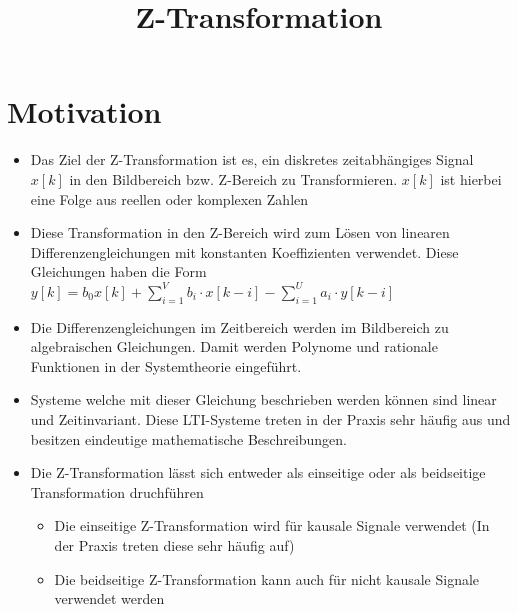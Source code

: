 \documentclass[11pt]{article}
\title{Z-Transformation}
\begin{document}
    
    
    \maketitle
    
    

    
    \section{Motivation}\label{motivation}

\begin{itemize}
\item
  Das Ziel der Z-Transformation ist es, ein diskretes zeitabhängiges
  Signal \(x[k]\) in den Bildbereich bzw. Z-Bereich zu Transformieren.
  \(x[k]\) ist hierbei eine Folge aus reellen oder komplexen Zahlen
\item
  Diese Transformation in den Z-Bereich wird zum Lösen von linearen
  Differenzengleichungen mit konstanten Koeffizienten verwendet. Diese
  Gleichungen haben die Form
  \(y[k] = b_0 x[k] + \sum_{i=1}^V b_i \cdot x[k-i] - \sum_{i=1}^U a_i \cdot y[k-i]\)
\item
  Die Differenzengleichungen im Zeitbereich werden im Bildbereich zu
  algebraischen Gleichungen. Damit werden Polynome und rationale
  Funktionen in der Systemtheorie eingeführt.
\item
  Systeme welche mit dieser Gleichung beschrieben werden können sind
  linear und Zeitinvariant. Diese LTI-Systeme treten in der Praxis sehr
  häufig aus und besitzen eindeutige mathematische Beschreibungen.
\item
  Die Z-Transformation lässt sich entweder als einseitige oder als
  beidseitige Transformation druchführen

  \begin{itemize}
  \item
    Die einseitige Z-Transformation wird für kausale Signale verwendet
    (In der Praxis treten diese sehr häufig auf)
  \item
    Die beidseitige Z-Transformation kann auch für nicht kausale Signale
    verwendet werden
  \end{itemize}
\end{itemize}
\end{document}
